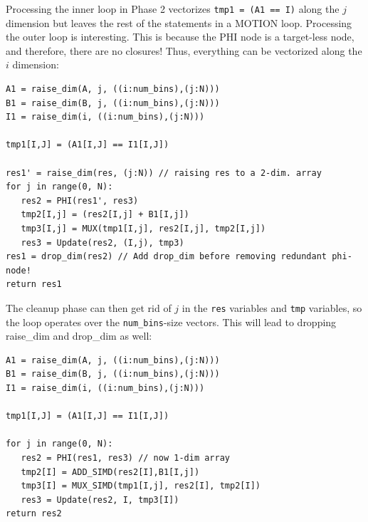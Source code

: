 \documentclass[sigconf, screen, natbib=false, dvipsnames, table]{acmart}
\theoremstyle{definition}
\begin{document}
Processing the inner loop in Phase 2 vectorizes \texttt{tmp1 = (A1 == I)} along the $j$ dimension but leaves the rest of the statements in a MOTION loop. Processing the outer loop is interesting. This is because the PHI node is a target-less node, and therefore, there are no closures! Thus, everything can be vectorized along the $i$ dimension:

{\small
\begin{verbatim}
A1 = raise_dim(A, j, ((i:num_bins),(j:N)))
B1 = raise_dim(B, j, ((i:num_bins),(j:N)))
I1 = raise_dim(i, ((i:num_bins),(j:N)))

tmp1[I,J] = (A1[I,J] == I1[I,J])

res1' = raise_dim(res, (j:N)) // raising res to a 2-dim. array
for j in range(0, N):
   res2 = PHI(res1', res3)
   tmp2[I,j] = (res2[I,j] + B1[I,j])
   tmp3[I,j] = MUX(tmp1[I,j], res2[I,j], tmp2[I,j])
   res3 = Update(res2, (I,j), tmp3)
res1 = drop_dim(res2) // Add drop_dim before removing redundant phi-node!      
return res1
\end{verbatim}
}

The cleanup phase can then get rid of $j$ in the \texttt{res} variables and \texttt{tmp} variables, so the loop operates over the \texttt{num\_bins}-size vectors. 
This will lead to dropping raise\_dim and drop\_dim as well: 

{\small
\begin{verbatim}
A1 = raise_dim(A, j, ((i:num_bins),(j:N)))
B1 = raise_dim(B, j, ((i:num_bins),(j:N)))
I1 = raise_dim(i, ((i:num_bins),(j:N)))

tmp1[I,J] = (A1[I,J] == I1[I,J])

for j in range(0, N):
   res2 = PHI(res1, res3) // now 1-dim array
   tmp2[I] = ADD_SIMD(res2[I],B1[I,j])
   tmp3[I] = MUX_SIMD(tmp1[I,j], res2[I], tmp2[I])
   res3 = Update(res2, I, tmp3[I])
return res2
\end{verbatim}
}
\end{document}
